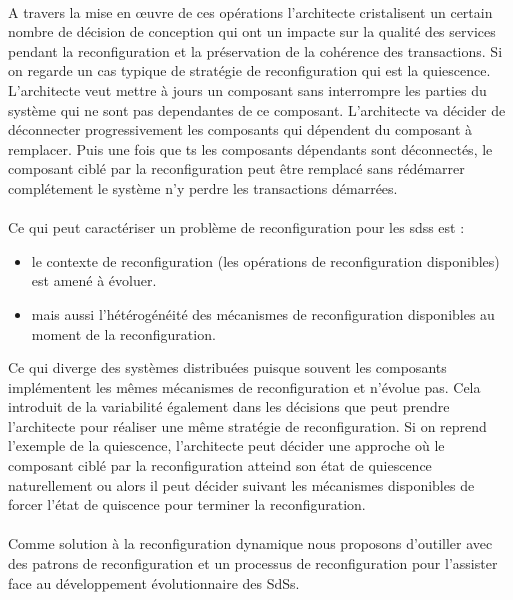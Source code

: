 \paragraph{}
A travers la mise en \oe{}uvre
de ces opérations l'architecte cristalisent un certain nombre de
décision de conception qui ont un impacte sur la qualité des services
pendant la reconfiguration et la préservation de la cohérence des
transactions. 
%
Si on regarde un cas typique de stratégie de
reconfiguration qui est la quiescence. L'architecte veut mettre à
jours un composant sans interrompre les parties du système qui ne sont
pas dependantes de ce composant. L'architecte va décider de déconnecter
progressivement les composants qui dépendent du composant à
remplacer. Puis une fois que ts les composants dépendants sont
déconnectés, le composant ciblé par la reconfiguration peut être
remplacé sans rédémarrer complétement le système n'y perdre les
transactions démarrées.


\paragraph{} 
Ce qui peut caractériser un problème de reconfiguration pour les sdss
est : 
\begin{itemize}
\item le contexte de reconfiguration (les opérations de
reconfiguration disponibles) est amené à évoluer. 
\item mais aussi l'hétérogénéité des mécanismes de reconfiguration disponibles au
moment de la reconfiguration. 
\end{itemize}

Ce qui diverge des systèmes distribuées
puisque souvent les composants implémentent les mêmes mécanismes de
reconfiguration et n'évolue pas. 
%
Cela introduit de la variabilité également dans les
décisions que peut prendre l'architecte pour réaliser une même
stratégie de reconfiguration. Si on reprend l'exemple de la
quiescence, l'architecte peut décider une approche où le composant
ciblé par la reconfiguration atteind son état de quiescence
naturellement ou alors il peut décider suivant les mécanismes
disponibles de forcer l'état de quiscence pour terminer la
reconfiguration. 

\paragraph{} 
Comme solution à la reconfiguration dynamique nous proposons
d'outiller avec des patrons de reconfiguration et un processus de
reconfiguration pour l'assister face au développement
évolutionnaire des SdSs. 

